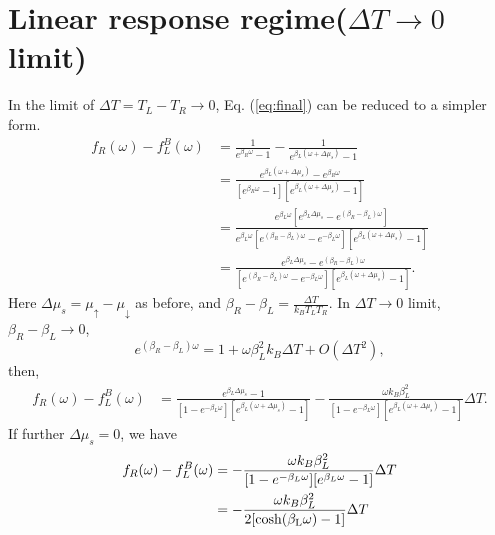 \documentclass[11pt,a4paper]{article}
\begin{document}
\section{Linear response regime($\Delta T\to 0$ limit)}
In the limit of $\Delta T=T_{L}-T_{R} \to 0$, Eq. (\ref{eq:final}) can be reduced to a simpler form.
\begin{equation}
\begin{split}
f_{R}(\omega)-f_{L}^{B}(\omega) &= \frac{1}{e^{\beta_{R}\omega}-1} - \frac{1}{e^{\beta_{L}(\omega+\Delta\mu_{s})}-1} \\
&= \frac{e^{\beta_{L}(\omega+\Delta\mu_{s})} - e^{\beta_{R}\omega}}{[e^{\beta_{R}\omega}-1][e^{\beta_{L}(\omega+\Delta\mu_{s})}-1]} \\
&= \frac{e^{\beta_{L}\omega}[e^{\beta_{L}\Delta\mu_{s}} - e^{(\beta_{R}-\beta_{L})\omega}]}{e^{\beta_{L}\omega}[e^{(\beta_{R}-\beta_{L})\omega}-e^{-\beta_{L}\omega}][e^{\beta_{L}(\omega+\Delta\mu_{s})}-1]} \\
&= \frac{e^{\beta_{L}\Delta\mu_{s}} - e^{(\beta_{R}-\beta_{L})\omega}}{[e^{(\beta_{R}-\beta_{L})\omega}-e^{-\beta_{L}\omega}][e^{\beta_{L}(\omega+\Delta\mu_{s})}-1]}.
\end{split}
\end{equation}
Here $\Delta\mu_{s} = \mu_{\uparrow} - \mu_{\downarrow}$ as before, and $\beta_{R}-\beta_L = \frac{\Delta T}{k_{B}T_{L}T_{R}}$. In $\Delta T\to 0$ limit, $\beta_{R}-\beta_{L} \to 0$,
\begin{equation}
e^{(\beta_{R}-\beta_{L})\omega} = 1 + \omega\beta_{L}^{2} k_{B}\Delta T + O(\Delta T^{2}),
\end{equation}
then,
\begin{equation}
\begin{split}
f_{R}(\omega)-f_{L}^{B}(\omega) &= \frac{e^{\beta_{L}\Delta\mu_{s}} - 1} {[ 1 - e^{-\beta_{L}\omega}][e^{\beta_{L}(\omega+\Delta\mu_{s})}-1]} - \frac{\omega k_{B}\beta_{L}^{2} } {[ 1 - e^{-\beta_{L}\omega}] [e^{\beta_{L} (\omega+\Delta \mu_{s})}-1]}\Delta T. 
\end{split}
\end{equation}
If further $\Delta\mu_{s} = 0$, we have
\begin{equation}
\begin{split}
f_{R}(\omega)-f_{L}^{B}(\omega) &= - \frac{\omega k_{B}\beta_{L}^{2}} {[ 1 - e^{-\beta_{L}\omega}] [e^{\beta_{L} \omega}-1]}\Delta T \\
&=  - \frac{\omega k_{B}\beta_{L}^{2}} {2[\rm{cosh}(\beta_{L}\omega)-1]}\Delta T
\end{split}
\end{equation}
\end{document}
